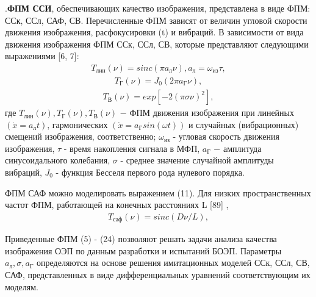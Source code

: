  .\textbf{ФПМ ССИ}, обеспечивающих качество изображения, представлена в виде ФПМ: ССк, ССл, САФ, СВ. Перечисленные ФПМ зависят от величин угловой скорости движения изображения, расфокусировки (t) и вибраций. 
В зависимости от вида движения изображения ФПМ ССк, ССл, СВ, которые представляют следующими выражениями [6, 7]: 
\begin{equation}
\label{eq:p2:fp16}
\begin{alignedat}{2}
T_\textit{лин}(\nu) = sinc(\pi a_\textit{л} \nu), a_\textit{л} = \omega_\textit{из} \tau,
\end{alignedat}
\end{equation}
\begin{equation}
\label{eq:p2:fp17}
\begin{alignedat}{2}
T_\textit{Г}(\nu) = J_0 (2\pi a_\textit{Г} \nu),
\end{alignedat}
\end{equation}
\begin{equation}
\label{eq:p2:fp18}
\begin{alignedat}{2}
T_\textit{В}(\nu) = exp[-2(\pi \sigma \nu)^2],
\end{alignedat}
\end{equation}
где $T_\textit{лин}(\nu), T_\textit{Г}(\nu), T_\textit{В}(\nu)$ − ФПМ движения изображения при линейных $(\dot{x} = a_\textit{л} t)$, гармонических $(\dot{x} = a_\textit{Г} sin(\omega t))$  и случайных (вибрационных) смещений изображения, соответственно; $\omega_\textit{из}$ - угловая скорость движения изображения, $\tau$ - время накопления сигнала в МФП, $a_\textit{Г}$ − амплитуда синусоидального колебания, $\sigma$ - среднее значение случайной амплитуды вибраций, $J_0$ - функция Бесселя первого рода нулевого порядка.

ФПМ САФ можно моделировать выражением (11). Для низких пространственных частот ФПМ, работающей на конечных расстояниях L [89] ,
\begin{equation}
\label{eq:p2:fp19}
\begin{alignedat}{2}
T_\textit{саф}(\nu) = sinc( D \nu / L),
\end{alignedat}
\end{equation}

Приведенные  ФПМ (5) - (24) позволяют решать задачи анализа качества изображения ОЭП по данным разработки и испытаний БОЭП. Параметры $a_\textit{л}, \sigma, a_\textit{Г}$ определяются на основе решения имитационных моделей ССк, ССл, СВ, САФ, представленных в виде дифференциальных уравнений соответствующим их моделям.

